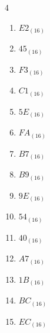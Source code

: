 \begin{multicols}{4}
\begin{enumerate}
        \phantom{$=182$}

  \item $E2_{(16)}$

        \phantom{$=226$}

  \item $45_{(16)}$

        \phantom{$=69$}

  \item $F3_{(16)}$

        \phantom{$=243$}

  \item $C1_{(16)}$

        \phantom{$=193$}

  \item $5E_{(16)}$

        \phantom{$=94$}

\columnbreak %

  \item $FA_{(16)}$

        \phantom{$=250$}

  \item $B7_{(16)}$

        \phantom{$=183$}

  \item $B9_{(16)}$

        \phantom{$=185$}

  \item $9E_{(16)}$

        \phantom{$=158$}

  \item $54_{(16)}$

        \phantom{$=84$}

  \item $40_{(16)}$

        \phantom{$=64$}

  \item $A7_{(16)}$

        \phantom{$=167$}

  \item $1B_{(16)}$

        \phantom{$=27$}

  \item $BC_{(16)}$

        \phantom{$=188$}

  \item $EC_{(16)}$

        \phantom{$=236$}


\end{enumerate}
\end{multicols}
